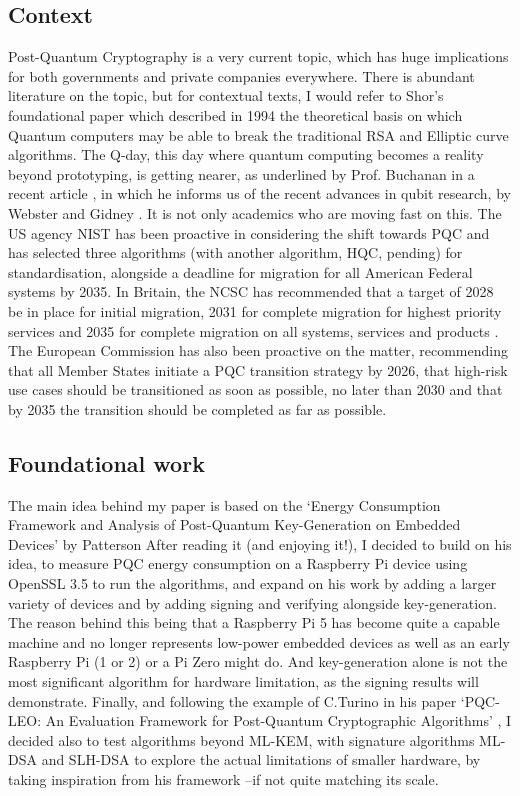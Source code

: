 \documentclass[11pt, letterpaper]{article}
\begin{document}
\subsection{Context}
Post-Quantum Cryptography is a very current topic, which has huge implications for both governments and private companies everywhere. There is abundant literature on the topic, but for contextual texts, I would refer to Shor’s foundational paper \cite{shor1994algorithms} which described in 1994 the theoretical basis on which Quantum computers may be able to break the traditional RSA and Elliptic curve algorithms. The Q-day, this day where quantum computing becomes a reality beyond prototyping, is getting nearer, as underlined by Prof. Buchanan in a recent article \cite{buchanan2026qday}, in which he informs us of the recent advances in qubit research, by Webster \cite{webster2026pinnacle} and Gidney \cite{gidney2025factor}.
It is not only academics who are moving fast on this. The US agency NIST has been proactive in considering the shift towards PQC and has selected three algorithms (with another algorithm, HQC, pending) for standardisation, alongside a deadline for migration for all American Federal systems by 2035. \cite{moody2024transition,moody2025roadahead} In Britain, the NCSC has recommended that a target of 2028 be in place for initial migration, 2031 for complete migration for highest priority services and 2035 for complete migration on all systems, services and products \cite{ncsc2025migrating,national2025timelines}. The European Commission has also been proactive on the matter, recommending that all Member States initiate a PQC transition strategy by 2026, that high-risk use cases should be transitioned as soon as possible, no later than 2030 and that by 2035 the transition should be completed as far as possible. \cite{ec2025pqc}
\subsection{Foundational work}
The main idea behind my paper is based on the ‘Energy Consumption Framework and Analysis of Post-Quantum Key-Generation on Embedded Devices’ by Patterson \cite{patterson2025energy} After reading it (and enjoying it!), I decided to build on his idea, to measure PQC energy consumption on a Raspberry Pi device using OpenSSL 3.5 to run the algorithms, and expand on his work by adding a larger variety of devices and by adding signing and verifying alongside key-generation. The reason behind this being that a Raspberry Pi 5 has become quite a capable machine and no longer represents low-power embedded devices as well as an early Raspberry Pi (1 or 2) or a Pi Zero might do. And key-generation alone is not the most significant algorithm for hardware limitation, as the signing results will demonstrate. Finally, and following the example of C.Turino in his paper ‘PQC-LEO: An Evaluation Framework for Post-Quantum Cryptographic Algorithms’ \cite{turino2025pqc}, I decided also to test algorithms beyond ML-KEM, with signature algorithms ML-DSA and SLH-DSA to explore the actual limitations of smaller hardware, by taking inspiration from his framework –if not quite matching its scale.
\end{document}
